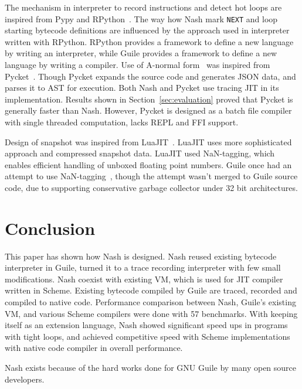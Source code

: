 \documentclass[preprint, 10pt]{sigplanconf}
\begin{document}
The mechanism in interpreter to record instructions and detect hot loops are
inspired from Pypy and RPython~\cite{bolz2009tracing}. The way how Nash mark
\texttt{NEXT} and loop starting bytecode definitions are influenced by the
approach used in interpreter written with RPython.  RPython provides a
framework to define a new language by writing an interpreter, while Guile
provides a framework to define a new language by writing a compiler.  Use of
A-normal form~\cite{flanagan1993essence} was inspired from
Pycket~\cite{bauman2015pycket}. Though Pycket expands the source code and
generates JSON data, and parses it to AST for execution. Both Nash and Pycket
use tracing JIT in its implementation. Results shown in
Section~\ref{sec:evaluation} proved that Pycket is generally faster than Nash.
However, Pycket is designed as a batch file compiler with single threaded
computation, lacks REPL and FFI support.

Design of snapshot was inspired from LuaJIT~\cite{pall2009ip}. LuaJIT uses
more sophisticated approach and compressed snapshot data. LuaJIT used
NaN-tagging, which enables efficient handling of unboxed floating point
numbers. Guile once had an attempt to use NaN-tagging~\cite{wingo2011value},
though the attempt wasn't merged to Guile source code, due to supporting
conservative garbage collector under 32 bit architectures.

\section{Conclusion}
\label{sec:conclusion}
This paper has shown how Nash is designed. Nash reused existing bytecode
interpreter in Guile, turned it to a trace recording interpreter with few
small modifications. Nash coexist with existing VM, which is used for JIT
compiler written in Scheme. Existing bytecode compiled by Guile are traced,
recorded and compiled to native code. Performance comparison between Nash,
Guile's existing VM, and various Scheme compilers were done with 57
benchmarks. With keeping itself as an extension language, Nash showed
significant speed ups in programs with tight loops, and achieved competitive
speed with Scheme implementations with native code compiler in overall
performance.


\acks{} Nash exists because of the hard works done for GNU Guile by many open
source developers.







\end{document}
